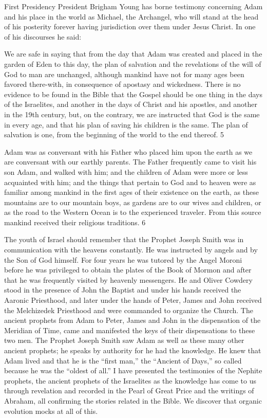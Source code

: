 First Presidency President Brigham Young has borne testimony concerning Adam and his
place in the world as Michael, the Archangel, who will stand at the head of his posterity
forever having jurisdiction over them under Jesus Christ. In one of his discourses he said:

We are safe in saying that from the day that Adam was created and placed in the garden of
Eden to this day, the plan of salvation and the revelations of the will of God to man are
unchanged, although mankind have not for many ages been favored there-with, in
consequence of apostasy and wickedness. There is no evidence to be found in the Bible that
the Gospel should be one thing in the days of the Israelites, and another in the days of Christ
and his apostles, and another in the 19th century, but, on the contrary, we are instructed that
God is the same in every age, and that his plan of saving his children is the same. The plan of
salvation is one, from the beginning of the world to the end thereof. 5

Adam was as conversant with his Father who placed him upon the earth as we are conversant
with our earthly parents. The Father frequently came to visit his son Adam, and walked with
him; and the children of Adam were more or less acquainted with him; and the things that
pertain to God and to heaven were as familiar among mankind in the first ages of their
existence on the earth, as these mountains are to our mountain boys, as gardens are to our
wives and children, or as the road to the Western Ocean is to the experienced traveler. From
this source mankind received their religious traditions. 6

The youth of Israel should remember that the Prophet Joseph Smith was in communication
with the heavens constantly. He was instructed by angels and by the Son of God himself. For
four years he was tutored by the Angel Moroni before he was privileged to obtain the plates
of the Book of Mormon and after that he was frequently visited by heavenly messengers. He
and Oliver Cowdery stood in the presence of John the Baptist and under his hands received
the Aaronic Priesthood, and later under the hands of Peter, James and John received the
Melchizedek Priesthood and were commanded to organize the Church. The ancient prophets
from Adam to Peter, James and John in the dispensation of the Meridian of Time, came and
manifested the keys of their dispensations to these two men. The Prophet Joseph Smith saw
Adam as well as these many other ancient prophets; he speaks by authority for he had the
knowledge. He knew that Adam lived and that he is the ``first man,'' the ``Ancient of Days,''
so called because he was the ``oldest of all.'' I have presented the testimonies of the Nephite
prophets, the ancient prophets of the Israelites as the knowledge has come to us through
revelation and recorded in the Pearl of Great Price and the writings of Abraham, all
confirming the stories related in the Bible. We discover that organic evolution mocks at all of
this.

